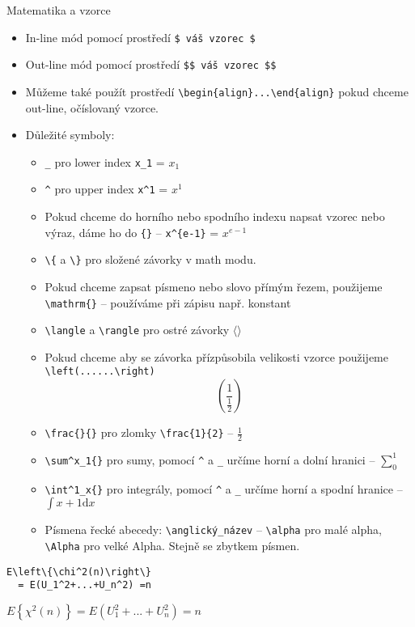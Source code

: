 \begin{subsection}{Matematika a vzorce}
\begin{itemize}
\item In-line mód pomocí prostředí \verb|$ váš vzorec $|
\item Out-line mód pomocí prostředí \verb|$$ váš vzorec $$|
\item Můžeme také použít prostředí \verb|\begin{align}...\end{align}| pokud chceme out-line, očíslovaný vzorce.

\item Důležité symboly:
\begin{itemize}
    
    \item \verb|_| pro lower index \verb|x_1| = $x_1$
    \item \verb|^| pro upper index \verb|x^1| = $x^1$
    \item Pokud chceme do horního nebo spodního indexu napsat vzorec nebo výraz, dáme ho do \verb|{}| -- \verb|x^{e-1}| = $x^{e-1}$
    \item \verb|\{| a \verb|\}| pro složené závorky v math modu.
    \item Pokud chceme zapsat písmeno nebo slovo přímým řezem, použijeme \verb|\mathrm{}| -- používáme při zápisu např. konstant
    \item \verb|\langle| a \verb|\rangle| pro ostré závorky  $\langle \rangle$
    \item Pokud chceme aby se závorka přízpůsobila velikosti vzorce použijeme\\ \verb|\left(......\right)| $$\left(\frac{1}{\frac{1}{2}}\right)$$

    \item \verb|\frac{}{}| pro zlomky \verb|\frac{1}{2}| -- $\frac{1}{2}$
    \item \verb|\sum^x_1{}| pro sumy, pomocí \verb|^| a \verb|_| určíme horní a dolní hranici -- $\sum^1_0$
    \item \verb|\int^1_x{}| pro integrály, pomocí \verb|^| a \verb|_| určíme horní a spodní hranice -- $\int{x+1 \mathrm{ d}x}$
    \item Písmena řecké abecedy: \verb|\anglický_název| -- \verb|\alpha| pro malé alpha, \verb|\Alpha| pro velké Alpha. Stejně se zbytkem písmen.
   
\end{itemize}
\end{itemize}
\begin{multicols}{2}
    \begin{lstlisting}[frame = single]
  E\left\{\chi^2(n)\right\} 
  = E(U_1^2+...+U_n^2) =n
\end{lstlisting}
\columnbreak
$E\left\{\chi^2(n)\right\} = E(U_1^2+...+U_n^2) = n$
\end{multicols}



\end{subsection}

